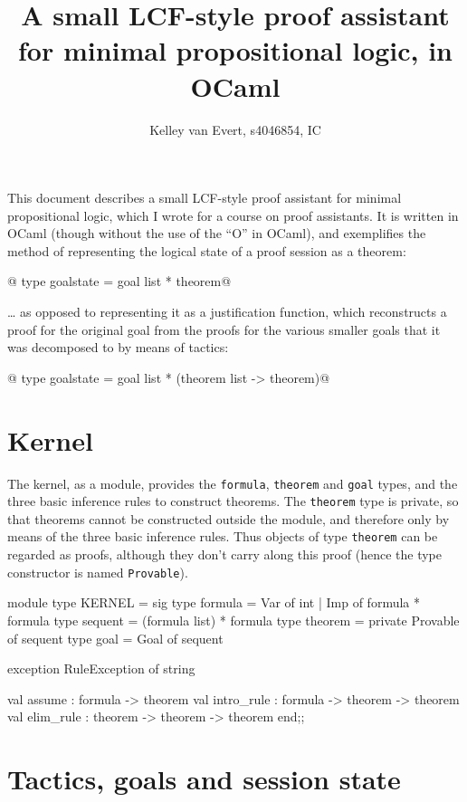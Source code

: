 \documentclass[a4paper,11pt]{article} %
\title{A small LCF-style proof assistant for minimal propositional logic, in OCaml}
\author{Kelley van Evert, s4046854, IC}
\begin{document}
\maketitle

This document describes a small LCF-style proof assistant for minimal propositional logic, which I wrote for a course on proof assistants. It is written in OCaml (though without the use of the “O” in OCaml), and exemplifies the method of representing the logical state of a proof session as a theorem:

@  type goalstate = goal list * theorem@

… as opposed to representing it as a justification function, which reconstructs a proof for the original goal from the proofs for the various smaller goals that it was decomposed to by means of tactics:

@  type goalstate = goal list * (theorem list -> theorem)@

\section{Kernel}

The kernel, as a module, provides the \texttt{formula}, \texttt{theorem} and \texttt{goal} types, and the three basic inference rules to construct theorems. The \texttt{theorem} type is private, so that theorems cannot be constructed outside the module, and therefore only by means of the three basic inference rules. Thus objects of type \texttt{theorem} can be regarded as proofs, although they don't carry along this proof (hence the type constructor is named \texttt{Provable}).

\begin{ocamlcode}
  module type KERNEL =
    sig
      type formula = Var of int | Imp of formula * formula
      type sequent = (formula list) * formula
      type theorem = private Provable of sequent
      type goal = Goal of sequent

      exception RuleException of string

      val assume : formula -> theorem
      val intro_rule : formula -> theorem -> theorem
      val elim_rule : theorem -> theorem -> theorem
    end;;
\end{ocamlcode}


\section{Tactics, goals and session state}
\end{document}
